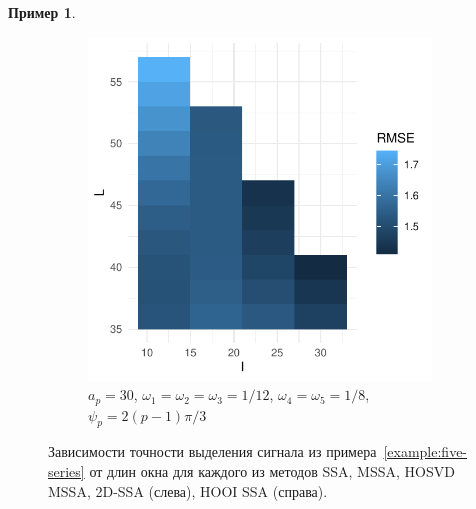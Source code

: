 \documentclass[specialist,
    substylefile = spbu_report.rtx,
    subf,href,colorlinks=true, 12pt]{disser}
\theoremstyle{plain}
\theoremstyle{definition}
\newtheorem{example}{Пример}[section]
\theoremstyle{remark}
\begin{document}
\begin{example}
\begin{figure}
\begin{subfigure}{.95\linewidth}
                \includegraphics[width=.34\linewidth]{five-series-fourth_hooi}
                \caption{$a_p = 30$, $\omega_1=\omega_2=\omega_3=1/12$, $\omega_4=\omega_5=1/8$, $\psi_p=2(p-1)\pi/3$}
            \end{subfigure}
            \caption{Зависимости точности выделения сигнала из примера~\ref{example:five-series}
            от длин окна для каждого из методов
            SSA, MSSA, HOSVD MSSA, 2D-SSA (слева), HOOI SSA (справа).}
            \label{fig:five-series-example}
        \end{figure}
    \end{example}
\end{document}
